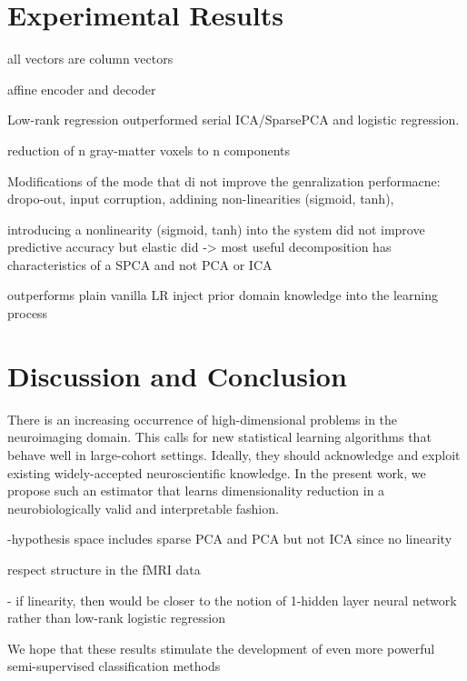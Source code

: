 \documentclass{article} %
\begin{document}
\section{Experimental Results}


all vectors are column vectors

affine encoder and decoder

Low-rank regression outperformed serial ICA/SparsePCA and logistic regression.

reduction of n gray-matter voxels to n components





Modifications of the mode that di not improve the genralization performacne:
dropo-out, input corruption, addining non-linearities (sigmoid, tanh),


introducing a
nonlinearity (sigmoid, tanh) into the system did not improve predictive accuracy but
elastic did -> most useful decomposition has characteristics of a SPCA
and not PCA or ICA

outperforms plain vanilla LR
inject prior domain knowledge into the learning process





\section{Discussion and Conclusion}
%
There is an increasing occurrence of high-dimensional problems in the
neuroimaging domain. This calls for new statistical learning algorithms that
behave well in large-cohort settings. Ideally, they should acknowledge
and exploit existing widely-accepted neuroscientific knowledge.
In the present work, we propose such an estimator that learns
dimensionality reduction
in a neurobiologically valid and interpretable fashion.

\linebreak

-hypothesis space includes sparse PCA and PCA but not ICA since no
linearity

respect structure in the fMRI data


- if linearity, then would be closer to the notion of 1-hidden layer neural
network rather than low-rank logistic regression



We hope that these results stimulate the development of
even more powerful semi-supervised classification methods
\end{document}
